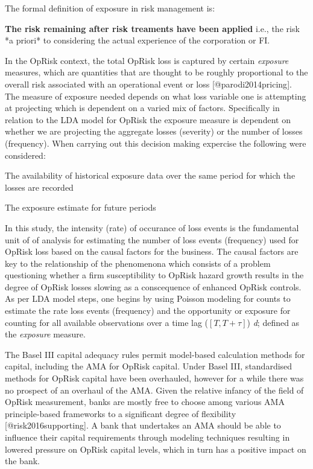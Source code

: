\documentclass[]{article}
\begin{document}
The formal definition of exposure in risk management is:

\begin{definition}
\textbf{The risk remaining after risk treaments have been applied} i.e., the risk *a priori* to considering the actual experience of the corporation or FI.
\end{definition}

In the OpRisk context, the total OpRisk loss is captured by certain
\emph{exposure} measures, which are quantities that are thought to be
roughly proportional to the overall risk associated with an operational
event or loss {[}@parodi2014pricing{]}. The measure of exposure needed
depends on what loss variable one is attempting at projecting which is
dependent on a varied mix of factors. Specifically in relation to the
LDA model for OpRisk the exposure measure is dependent on whether we are
projecting the aggregate losses (severity) or the number of losses
(frequency). When carrying out this decision making expercise the
following were considered:

\begin{list}{*}{}
\item The availability of historical exposure data over the same period for which the losses are recorded
\item The exposure estimate for future periods
\end{list}
\medskip

In this study, the intensity (rate) of occurance of loss events is the
fundamental unit of of analysis for estimating the number of loss events
(frequency) used for OpRisk loss based on the causal factors for the
business. The causal factors are key to the relationship of the
phenomenona which consists of a problem questioning whether a firm
susceptibility to OpRisk hazard growth results in the degree of OpRisk
losses slowing as a conscequence of enhanced OpRisk controls. As per LDA
model steps, one begins by using Poisson modeling for counts to estimate
the rate loss events (frequency) and the opportunity or exposure for
counting for all available observations over a time lag (\([T,T+\tau]\))
\emph{d}; defined as the \emph{exposure} measure.\medskip

The Basel III capital adequacy rules permit model-based calculation
methods for capital, including the AMA for OpRisk capital. Under Basel
III, standardised methods for OpRisk capital have been overhauled,
however for a while there was no prospect of an overhaul of the AMA.
Given the relative infancy of the field of OpRisk measurement, banks are
mostly free to choose among various AMA principle-based frameworks to a
significant degree of flexibility {[}@risk2016supporting{]}. A bank that
undertakes an AMA should be able to influence their capital requirements
through modeling techniques resulting in lowered pressure on OpRisk
capital levels, which in turn has a positive impact on the bank.\medskip
\end{document}
